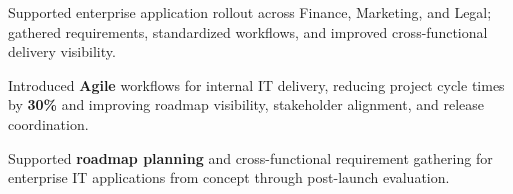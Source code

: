 \begin{resumeBullets}
  \item Supported enterprise application rollout across Finance, Marketing, and Legal; gathered requirements, standardized workflows, and improved cross-functional delivery visibility.
  \item Introduced \textbf{Agile} workflows for internal IT delivery, reducing project cycle times by \textbf{30\%} and improving roadmap visibility, stakeholder alignment, and release coordination.
  \item Supported \textbf{roadmap planning} and cross-functional requirement gathering for enterprise IT applications from concept through post-launch evaluation.
\end{resumeBullets}
